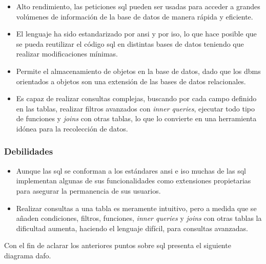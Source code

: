 \begin{itemize}
	\item Alto rendimiento, las peticiones \acrshort{sql} pueden ser usadas para acceder a grandes volúmenes de información de la base de datos de manera rápida y eficiente.

	\item El lenguaje ha sido estandarizado por \acrshort{ansi} y por \acrshort{iso}, lo que hace posible que se pueda reutilizar el código \acrshort{sql} en distintas bases de datos teniendo que realizar modificaciones mínimas.

	\item Permite el almacenamiento de objetos en la base de datos, dado que los \acrshort{dbms} orientados a objetos\cite{OODB} son una extensión de las bases de datos relacionales.

	\item Es capaz de realizar consultas complejas, buscando por cada campo definido en las tablas, realizar filtros avanzados con \textit{inner queries}, ejecutar todo tipo de funciones y \textit{joins} con otras tablas, lo que lo convierte en una herramienta idónea para la recolección de datos.
\end{itemize}

\subsubsection{Debilidades}

\begin{itemize}
	\item Aunque las  \acrshort{sql} se conforman a los estándares \acrshort{ansi} e \acrshort{iso} muchas de las  \acrshort{sql} implementan algunas de sus funcionalidades como extensiones propietarias para asegurar la permanencia de sus usuarios.

	\item Realizar consultas a una tabla es meramente intuitivo, pero a medida que se añaden condiciones, filtros, funciones, \textit{inner queries} y \textit{joins} con otras tablas la dificultad aumenta, haciendo el lenguaje difícil, para consultas avanzadas.
\end{itemize}

Con el fin de aclarar los anteriores puntos sobre \acrshort{sql} presenta el siguiente diagrama \acrfull{dafo}.

